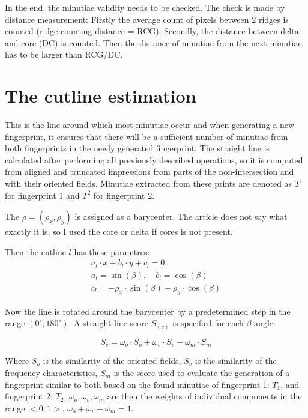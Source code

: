 In the end, the minutiae validity needs to be checked. The check is made by distance measurement: Firstly the average count of pixels between 2 ridges is counted (ridge counting distance = RCG). Secondly, the distance between delta and core (DC) is counted. Then the distance of minutiae from the next minutiae has to be larger than RCG/DC.\cite{thinning}

\section{The cutline estimation}
This is the line around which most minutiae occur and when generating a new fingerprint, it ensures that there will be a sufficient number of minutiae from both fingerprints in the newly generated fingerprint. The straight line is calculated after performing all previously described operations, so it is computed from aligned and truncated impressions from parts of the non-intersection and with their oriented fields. Minutiae extracted from these prints are denoted as $T^1$ for fingerprint 1 and $ T^2 $ for fingerprint 2.\cite{morphing_paper}

The $ \rho = (\rho_x, \rho_y) $ is assigned as a barycenter. The article does not say what exactly it is, so I used the core or delta if cores is not present. \cite{morphing_paper}

Then the cutline $l$ has these paramtres:\cite{morphing_paper}
\begin{equation}
    \begin{array}{l}
    a_{l} \cdot x+b_{l} \cdot y+c_{l}=0 \\
    a_{l}=\sin (\beta), \quad b_{l}=\cos (\beta) \\
    c_{l}=-\rho_{x} \cdot \sin (\beta)-\rho_{y} \cdot \cos (\beta)
    \end{array}
\end{equation}

Now the line is rotated around the barycenter by a predetermined step in the range $ (0^{\circ}, 180^{\circ}) $. A straight line score $S_(c)$ is specified for each $\beta$ angle: \cite{morphing_paper}

\begin{equation}
    S_{c}=\omega_{o} \cdot S_{o}+\omega_{v} \cdot S_{v}+\omega_{m} \cdot S_{m}
\end{equation}

Where $S_o$ is the similarity of the oriented fields, $S_v$ is the similarity of the frequency characteristics, $S_m$ is the score used to evaluate the generation of a fingerprint similar to both based on the found minutiae of fingerprint 1: $ T_1 $, and fingerprint 2: $ T_2 $. $ \omega_{o}, \omega_{v}, \omega_{m} $ are then the weights of individual components in the range $ <0; 1> $, $ \omega_{o} + \omega_{v} + \omega_{m} = 1$. \cite{morphing_paper}

